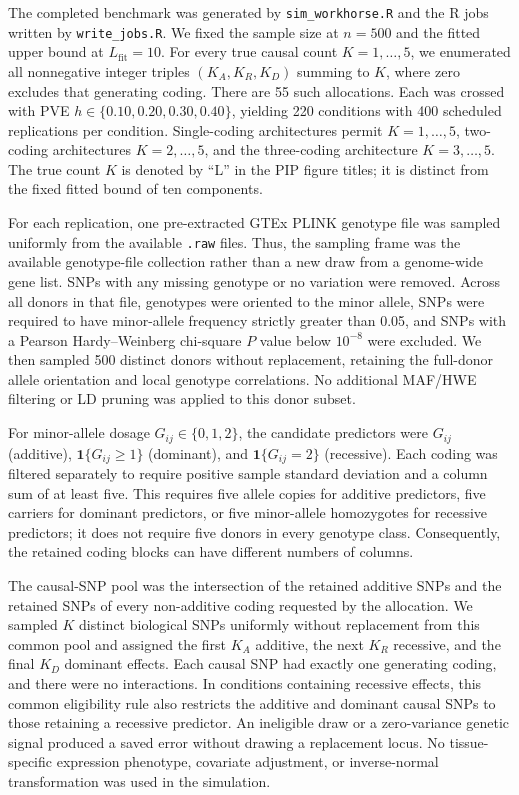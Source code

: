 \documentclass[12pt]{article}
\begin{document}
The completed benchmark was generated by \texttt{sim\_workhorse.R} and
the R jobs written by \texttt{write\_jobs.R}. We fixed the sample size
at $n=500$ and the fitted upper bound at $L_{\mathrm{fit}}=10$.
For every true causal count $K=1,\ldots,5$, we enumerated all
nonnegative integer triples $(K_A,K_R,K_D)$ summing to $K$, where zero
excludes that generating coding. There are 55 such allocations. Each
was crossed with PVE $h\in\{0.10,0.20,0.30,0.40\}$, yielding 220
conditions with 400 scheduled replications per condition. Single-coding
architectures permit $K=1,\ldots,5$, two-coding architectures
$K=2,\ldots,5$, and the three-coding architecture $K=3,\ldots,5$.
The true count $K$ is denoted by ``L'' in the PIP figure titles; it is
distinct from the fixed fitted bound of ten components.

For each replication, one pre-extracted GTEx PLINK genotype file was
sampled uniformly from the available \texttt{.raw} files. Thus, the
sampling frame was the available genotype-file collection rather than
a new draw from a genome-wide gene list. SNPs with any missing
genotype or no variation were removed. Across all donors in that file,
genotypes were oriented to the minor allele, SNPs were required to
have minor-allele frequency strictly greater than 0.05, and SNPs with
a Pearson Hardy--Weinberg chi-square $P$ value below $10^{-8}$ were
excluded. We then sampled 500 distinct donors without replacement,
retaining the full-donor allele orientation and local genotype
correlations. No additional MAF/HWE filtering or LD pruning was applied
to this donor subset.

For minor-allele dosage $G_{ij}\in\{0,1,2\}$, the candidate predictors
were $G_{ij}$ (additive), $\mathbf{1}\{G_{ij}\geq1\}$ (dominant), and
$\mathbf{1}\{G_{ij}=2\}$ (recessive). Each coding was filtered separately
to require positive sample standard deviation and a column sum of at
least five. This requires five allele copies for additive predictors,
five carriers for dominant predictors, or five minor-allele homozygotes
for recessive predictors; it does not require five donors in every
genotype class. Consequently, the retained coding blocks can have
different numbers of columns.

The causal-SNP pool was the intersection of the retained additive SNPs
and the retained SNPs of every non-additive coding requested by the
allocation. We sampled $K$ distinct biological SNPs uniformly without
replacement from this common pool and assigned the first $K_A$ additive,
the next $K_R$ recessive, and the final $K_D$ dominant effects. Each
causal SNP had exactly one generating coding, and there were no
interactions. In conditions containing recessive effects, this common
eligibility rule also restricts the additive and dominant causal SNPs
to those retaining a recessive predictor. An ineligible draw or a
zero-variance genetic signal produced a saved error without drawing a
replacement locus. No tissue-specific expression phenotype, covariate
adjustment, or inverse-normal transformation was used in the simulation.
\end{document}
